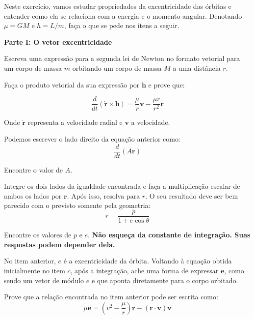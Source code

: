 \documentclass[11pt]{article}
\begin{document}
\begin{pproblem}
    Neste exercício, vamos estudar propriedades da excentricidade das órbitas e entender como ela se relaciona com a energia e o momento angular. Denotando \(\mu = GM\) e \(h=L/m\), faça o que se pede nos itens a seguir.
    \begin{center}
        \textbf{Parte I: O vetor excentricidade}
    \end{center}
    \begin{alternativas}
        \item Escreva uma expressão para a segunda lei de Newton no formato vetorial para um corpo de massa \(m\) orbitando um corpo de massa \(M\) a uma distância \(r\).
        
        \item Faça o produto vetorial da sua expressão por \(\mathbf{h}\) e prove que:
        
        \[\frac{d}{dt}(\dot{\mathbf{r}}\times \mathbf{h}) = \frac{\mu}{r}\mathbf{v} - \frac{\mu \dot{r}}{r^2}\mathbf{r}\]

        Onde \(\dot{\mathbf{r}}\) representa a velocidade radial e \(\mathbf{v}\) a velocidade.

        \item Podemos escrever o lado direito da equação anterior como:
        \[\frac{d}{dt}\left(A\mathbf{r}\right)\]

        Encontre o valor de \(A\).

        \item Integre os dois lados da igualdade encontrada e faça a multiplicação escalar de ambos os lados por \(\mathbf{r}\). Após isso, resolva para \(r\). O seu resultado deve ser bem parecido com o previsto somente pela geometria:
        \[r = \frac{p}{1+e\cos\theta}\]

        Encontre os valores de \(p\) e \(e\). \textbf{Não esqueça da constante de integração. Suas respostas podem depender dela.}

        \item No item anterior, \(e\) é a excentricidade da órbita. Voltando à equação obtida inicialmente no item \(c\), após a integração, ache uma forma de expressar \(\mathbf{e}\), como sendo um vetor de módulo \(e\) e que aponta diretamente para o corpo orbitado.
        
        \item Prove que a relação encontrada no item anterior pode ser escrita como:
        \[\mu \mathbf{e} = (v^2-\frac{\mu}{r})\mathbf{r} - (\mathbf{r}\cdot\mathbf{v})\mathbf{v}\]


\end{alternativas}
\end{pproblem}
\end{document}
